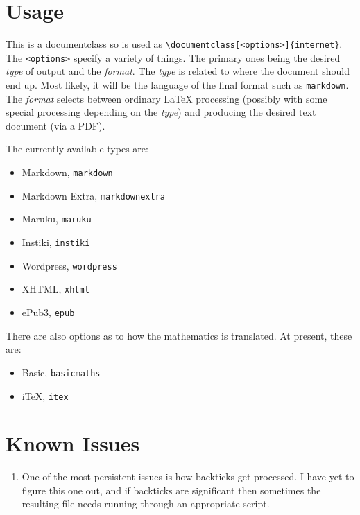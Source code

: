 \documentclass[github,text]{internet}
\begin{document}
\section{Usage}

This is a documentclass so is used as \verb+\documentclass[<options>]{internet}+.
The \verb+<options>+ specify a variety of things.
The primary ones being the desired \emph{type} of output and the \emph{format}.
The \emph{type} is related to where the document should end up.
Most likely, it will be the language of the final format such as \verb+markdown+.
The \emph{format} selects between ordinary \LaTeX{} processing (possibly with some special processing depending on the \emph{type}) and producing the desired text document (via a PDF).

The currently available types are:

\begin{itemize}
\item Markdown, \verb+markdown+
\item Markdown Extra, \verb+markdownextra+
\item Maruku, \verb+maruku+
\item Instiki, \verb+instiki+
\item Wordpress, \verb+wordpress+
\item XHTML, \verb+xhtml+
\item ePub3, \verb+epub+
\end{itemize}

There are also options as to how the mathematics is translated.
At present, these are:

\begin{itemize}
\item Basic, \verb+basicmaths+
\item iTeX, \verb+itex+
\end{itemize}

\section{Known Issues}

\begin{enumerate}
\item One of the most persistent issues is how backticks get processed.
I have yet to figure this one out, and if backticks are significant then sometimes the resulting file needs running through an appropriate script.
\end{enumerate}
\end{document}
